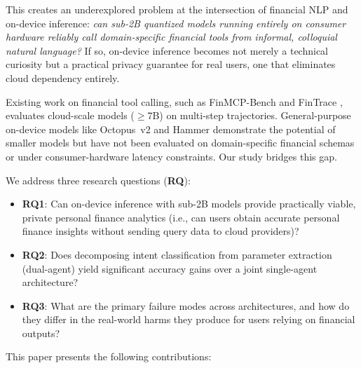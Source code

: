 \documentclass[11pt,twocolumn]{article}
\begin{document}
This creates an underexplored problem at the intersection of
financial NLP and on-device inference: \emph{can sub-2B quantized
models running entirely on consumer hardware reliably call
domain-specific financial tools from informal, colloquial
natural language?}
If so, on-device inference becomes not merely a technical
curiosity but a practical privacy guarantee for real users, one
that eliminates cloud dependency entirely.

Existing work on financial tool calling, such as FinMCP-Bench
\citep{finmcpbench2026} and FinTrace
\citep{fintrace2026}, evaluates cloud-scale models ($\geq$7B)
on multi-step trajectories.
General-purpose on-device models like Octopus~v2
\citep{chen2024octopus} and Hammer \citep{lin2024hammer}
demonstrate the potential of smaller models but have not
been evaluated on domain-specific financial schemas or
under consumer-hardware latency constraints.
Our study bridges this gap.

We address three research questions (\textbf{RQ}):

\begin{itemize}\itemsep=0pt \parskip=0pt \parsep=0pt
  \item \textbf{RQ1}: Can on-device inference with sub-2B models
        provide practically viable, private personal finance
        analytics (i.e., can users obtain accurate personal finance
        insights without sending query data to cloud providers)?
  \item \textbf{RQ2}: Does decomposing intent classification from
        parameter extraction (dual-agent) yield significant
        accuracy gains over a joint single-agent architecture?
  \item \textbf{RQ3}: What are the primary failure modes across
        architectures, and how do they differ in the real-world
        harms they produce for users relying on financial outputs?
\end{itemize}

This paper presents the following contributions:
\end{document}
